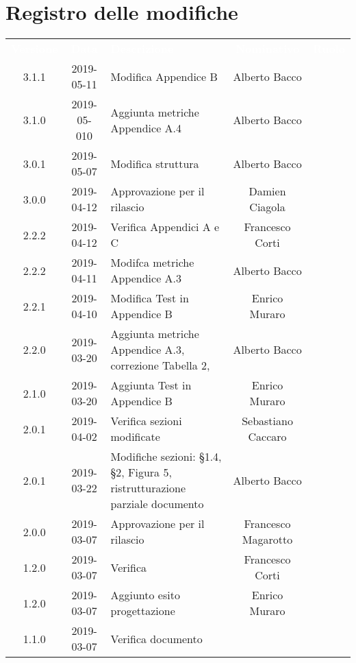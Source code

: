\section*{Registro delle modifiche}
{
	\renewcommand{\arraystretch}{1.5}
	\centering
	\begin{longtable}{c c C{4cm} c  c }
		\textcolor{white}{\textbf{Versione}} &
		\textcolor{white}{\textbf{Data}} &
		\textcolor{white}{\textbf{Descrizione}} &
		\textcolor{white}{\textbf{Nominativo}} &
		\textcolor{white}{\textbf{Ruolo}}
		
		\\
		3.1.1 &
		2019-05-11 &
		Modifica Appendice B &
		Alberto Bacco &
		\reda{}
		\\
		3.1.0 &
		2019-05-010 &
		Aggiunta metriche Appendice A.4 &
		Alberto Bacco &
		\reda{}
		\\
		3.0.1 &
		2019-05-07 &
		Modifica struttura &
		Alberto Bacco &
		\reda{}
		\\
		3.0.0 &
		2019-04-12 &
		Approvazione per il rilascio &
		Damien Ciagola &
		\Res{}
		\\
		2.2.2 &
		2019-04-12 &
		Verifica Appendici A e C &
		Francesco Corti &
		\ver{}	
		\\
		2.2.2 &
		2019-04-11 &
		Modifca metriche Appendice A.3 &
		Alberto Bacco &
		\reda{}	
		\\
		2.2.1 &
		2019-04-10 &
		Modifica Test in Appendice B &
		Enrico Muraro &
		\reda{}	
		\\
		2.2.0 &
		2019-03-20 &
		Aggiunta metriche Appendice A.3, correzione Tabella 2, &
		Alberto Bacco &
		\reda{}	
		\\
		2.1.0 &
		2019-03-20 &
		Aggiunta Test in Appendice B &
		Enrico Muraro &
		\reda{}	
		\\
		2.0.1 &
		2019-04-02 &
		Verifica sezioni modificate &
		Sebastiano Caccaro &
		\ver{}	
		\\
		2.0.1 &
		2019-03-22 &
		Modifiche sezioni: §1.4, §2, Figura 5, ristrutturazione parziale documento &
		Alberto Bacco &
		\reda{}	
		\\
		2.0.0 &
		2019-03-07 &
		Approvazione per il rilascio &
		Francesco Magarotto &
		\Res{}
		\\		
		1.2.0 &
		2019-03-07 &
		Verifica &
		Francesco Corti &
		\ver{} \\
		1.2.0 &
		2019-03-07 &
		Aggiunto esito progettazione &
		Enrico Muraro &
		\reda{}
		\\
		1.1.0 &
		2019-03-07 &
		Verifica documento &

\end{longtable}}
